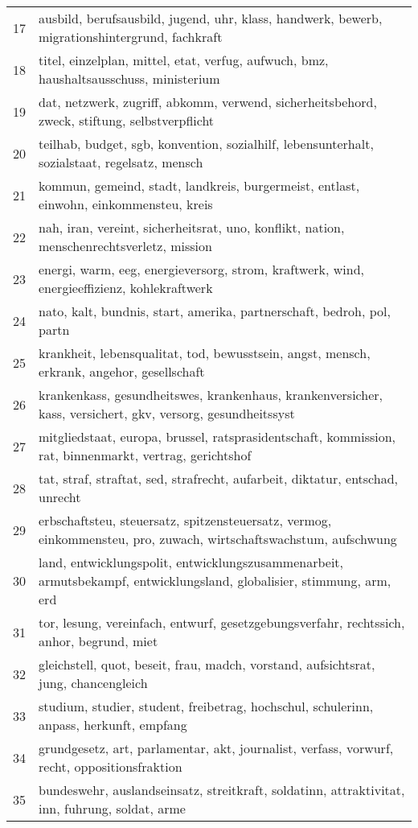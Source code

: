 \documentclass{article}
\begin{document}
\begin{table}[ht]
\begin{center}
\begin{tabular}{rl}
  17 & ausbild, berufsausbild, jugend, uhr, klass, handwerk, bewerb, migrationshintergrund, fachkraft \\ 
  18 & titel, einzelplan, mittel, etat, verfug, aufwuch, bmz, haushaltsausschuss, ministerium \\ 
  19 & dat, netzwerk, zugriff, abkomm, verwend, sicherheitsbehord, zweck, stiftung, selbstverpflicht \\ 
  20 & teilhab, budget, sgb, konvention, sozialhilf, lebensunterhalt, sozialstaat, regelsatz, mensch \\ 
  21 & kommun, gemeind, stadt, landkreis, burgermeist, entlast, einwohn, einkommensteu, kreis \\ 
  22 & nah, iran, vereint, sicherheitsrat, uno, konflikt, nation, menschenrechtsverletz, mission \\ 
  23 & energi, warm, eeg, energieversorg, strom, kraftwerk, wind, energieeffizienz, kohlekraftwerk \\ 
  24 & nato, kalt, bundnis, start, amerika, partnerschaft, bedroh, pol, partn \\ 
  25 & krankheit, lebensqualitat, tod, bewusstsein, angst, mensch, erkrank, angehor, gesellschaft \\ 
  26 & krankenkass, gesundheitswes, krankenhaus, krankenversicher, kass, versichert, gkv, versorg, gesundheitssyst \\ 
  27 & mitgliedstaat, europa, brussel, ratsprasidentschaft, kommission, rat, binnenmarkt, vertrag, gerichtshof \\ 
  28 & tat, straf, straftat, sed, strafrecht, aufarbeit, diktatur, entschad, unrecht \\ 
  29 & erbschaftsteu, steuersatz, spitzensteuersatz, vermog, einkommensteu, pro, zuwach, wirtschaftswachstum, aufschwung \\ 
  30 & land, entwicklungspolit, entwicklungszusammenarbeit, armutsbekampf, entwicklungsland, globalisier, stimmung, arm, erd \\ 
  31 & tor, lesung, vereinfach, entwurf, gesetzgebungsverfahr, rechtssich, anhor, begrund, miet \\ 
  32 & gleichstell, quot, beseit, frau, madch, vorstand, aufsichtsrat, jung, chancengleich \\ 
  33 & studium, studier, student, freibetrag, hochschul, schulerinn, anpass, herkunft, empfang \\ 
  34 & grundgesetz, art, parlamentar, akt, journalist, verfass, vorwurf, recht, oppositionsfraktion \\ 
  35 & bundeswehr, auslandseinsatz, streitkraft, soldatinn, attraktivitat, inn, fuhrung, soldat, arme \\ 

\end{tabular}
\end{center}
\end{table}
\end{document}
